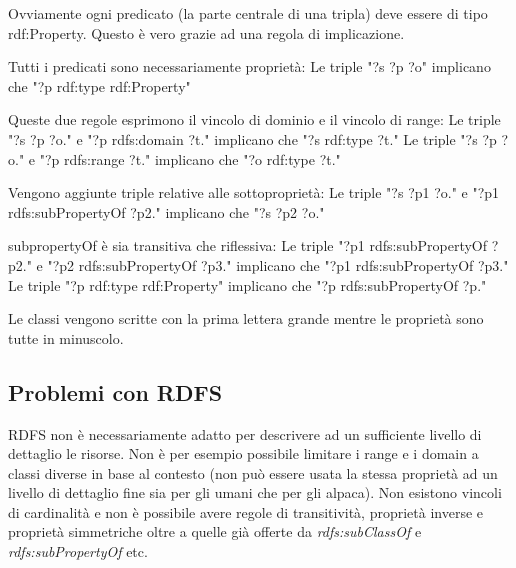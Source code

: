 \noindent Ovviamente ogni predicato (la parte centrale di una tripla) deve essere di tipo rdf:Property. Questo è vero grazie ad una regola di implicazione.

\begin{info}
	Tutti i predicati sono necessariamente proprietà:\newline
	Le triple \textcolor{ao(english)}{"?s ?p ?o"} implicano che \textcolor{ao(english)}{"?p rdf:type rdf:Property"}
\end{info}

\begin{info}
	Queste due regole esprimono il vincolo di dominio e il vincolo di range:\newline
	Le triple \textcolor{ao(english)}{"?s ?p ?o."} e  \textcolor{ao(english)}{"?p
		rdfs:domain ?t."} implicano che \textcolor{ao(english)}{"?s rdf:type ?t."}\newline
	Le triple \textcolor{ao(english)}{"?s ?p ?o."} e  \textcolor{ao(english)}{"?p
		rdfs:range ?t."} implicano che \textcolor{ao(english)}{"?o rdf:type ?t."}
\end{info}

\begin{info}
	Vengono aggiunte triple relative alle sottoproprietà:\newline
	Le triple \textcolor{ao(english)}{"?s ?p1 ?o."} e  \textcolor{ao(english)}{"?p1
		rdfs:subPropertyOf ?p2."} implicano che \textcolor{ao(english)}{"?s ?p2 ?o."}\newline
\end{info}

\begin{info}
	subpropertyOf è sia transitiva che riflessiva:\newline
	Le triple \textcolor{ao(english)}{"?p1 rdfs:subPropertyOf ?p2."} e  \textcolor{ao(english)}{"?p2 rdfs:subPropertyOf ?p3."} implicano che \textcolor{ao(english)}{"?p1 rdfs:subPropertyOf ?p3."}\newline
	Le triple \textcolor{ao(english)}{"?p rdf:type rdf:Property"} implicano che \textcolor{ao(english)}{"?p rdfs:subPropertyOf ?p."}
\end{info}

\begin{warn}[Convenzioni]
	Le classi vengono scritte con la prima lettera grande mentre le proprietà sono tutte in minuscolo.
\end{warn}

\subsection{Problemi con RDFS}
RDFS non è necessariamente adatto per descrivere ad un sufficiente livello di dettaglio le risorse. Non è per esempio possibile limitare i range e i domain a classi diverse in base al contesto (non può essere usata la stessa proprietà ad un livello di dettaglio fine sia per gli umani che per gli alpaca). Non esistono vincoli di cardinalità e non è possibile avere regole di transitività, proprietà inverse e proprietà simmetriche oltre a quelle già offerte da \textit{rdfs:subClassOf} e \textit{rdfs:subPropertyOf} etc.
\newpage
